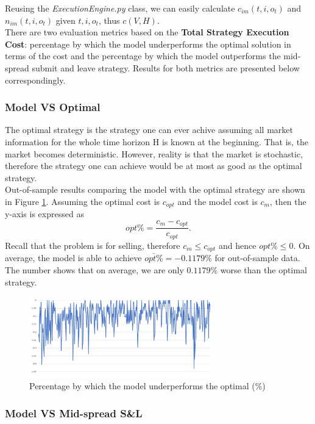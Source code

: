 \documentclass[12pt]{extarticle}
\begin{document}
\noindent Reusing the \textit{ExecutionEngine.py} class, we can easily calculate
$c_{im}(t, i, o_t)$ and $n_{im}(t, i, o_t)$ given $t, i, o_t$, thus $c(V, H)$.\\


\noindent There are two evaluation metrics based on the \textbf{Total Strategy Execution Cost}:
percentage by which the model underperforms the optimal solution in terms of the cost and the
percentage by which the model outperforms the mid-spread submit and leave strategy.
Results for both metrics are presented below correspondingly.

\subsubsection{Model VS Optimal}
The optimal strategy is the strategy one can ever achive assuming all market information for the whole
time horizon H is known at the beginning. That is, the market becomes deterministic.
However, reality is that the market is stochastic, therefore the strategy one can
achieve would be at most as good as the optimal strategy.\\


\noindent Out-of-sample results comparing the model with the optimal strategy are shown in Figure \ref{optimal}.
Assuming the optimal cost is $c_{opt}$ and the model cost is $c_{m}$, then the y-axis
is expressed as $$opt\% = \frac{c_{m} - c_{opt}}{c_{opt}}.$$
Recall that the problem is for selling, therefore $c_{m} \le c_{opt}$ and hence $opt\% \le 0$.
On average, the model is able to achieve $\bar{opt\%} = -0.1179\%$ for out-of-sample data.
The number shows that on average, we are only $0.1179\%$ worse than the optimal strategy.

\begin{figure}[h]
\centering
\includegraphics[width=0.7\textwidth]{optimal}
\caption{Percentage by which the model underperforms the optimal (\%)}
\label{optimal}
\end{figure}

\subsubsection{Model VS Mid-spread S\&L}
\end{document}
